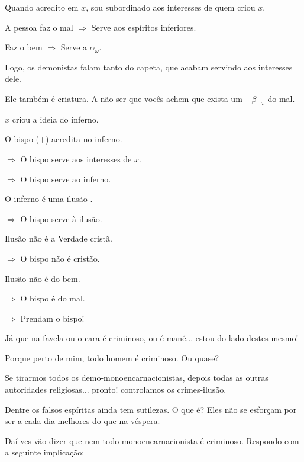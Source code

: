 \documentclass[12pt,a4paper]{article}
\begin{document}
			Quando acredito em $x$, sou subordinado aos interesses de quem criou $x$.

			A pessoa faz o mal $ \Rightarrow $ Serve aos esp\'iritos inferiores.

			Faz o bem $ \Rightarrow $ Serve a $ \alpha_\omega $.

			Logo, os demonistas falam tanto do capeta, que acabam servindo aos interesses dele.

			Ele tamb\'em \'e criatura. A n\~ao ser que voc\^es achem que exista um $ -\beta_{-\omega} $ do mal.

			\begin{flushright}
			\end{flushright}

			$x$ criou a ideia do inferno.

			O bispo\cite{x} (+) acredita no inferno.

			$ \Rightarrow $ O bispo serve aos interesses\cite{x} de $x$.

			$ \Rightarrow $ O bispo serve ao inferno\cite{x}.

			O inferno \'e uma ilus\~ao\cite{x} .

			$ \Rightarrow $ O bispo serve \`a ilus\~ao.

			Ilus\~ao n\~ao \'e a Verdade\cite{x} crist\~a.

			$ \Rightarrow $ O bispo n\~ao \'e crist\~ao.

			Ilus\~ao n\~ao \'e do bem.

			$ \Rightarrow $ O bispo \'e do mal.

			$ \Rightarrow $ Prendam o bispo!

			\begin{flushright}
			\end{flushright}

			J\'a que na favela ou o cara \'e criminoso, ou \'e man\'e... estou do lado destes mesmo!

			Porque perto de mim, todo homem \'e criminoso. Ou quase?

			Se tirarmos todos os demo-monoencarnacionistas, depois todas as outras autoridades religiosas... pronto! controlamos os crimes-ilus\~ao\cite{x}.

			Dentre os falsos esp\'iritas ainda tem sutilezas. O que \'e? Eles n\~ao se esfor\c{c}am por ser a cada dia melhores do que na v\'espera.

			Da\'i vcs v\~ao dizer que nem todo monoencarnacionista \'e criminoso. Respondo com a seguinte implica\c{c}\~ao:
\end{document}
